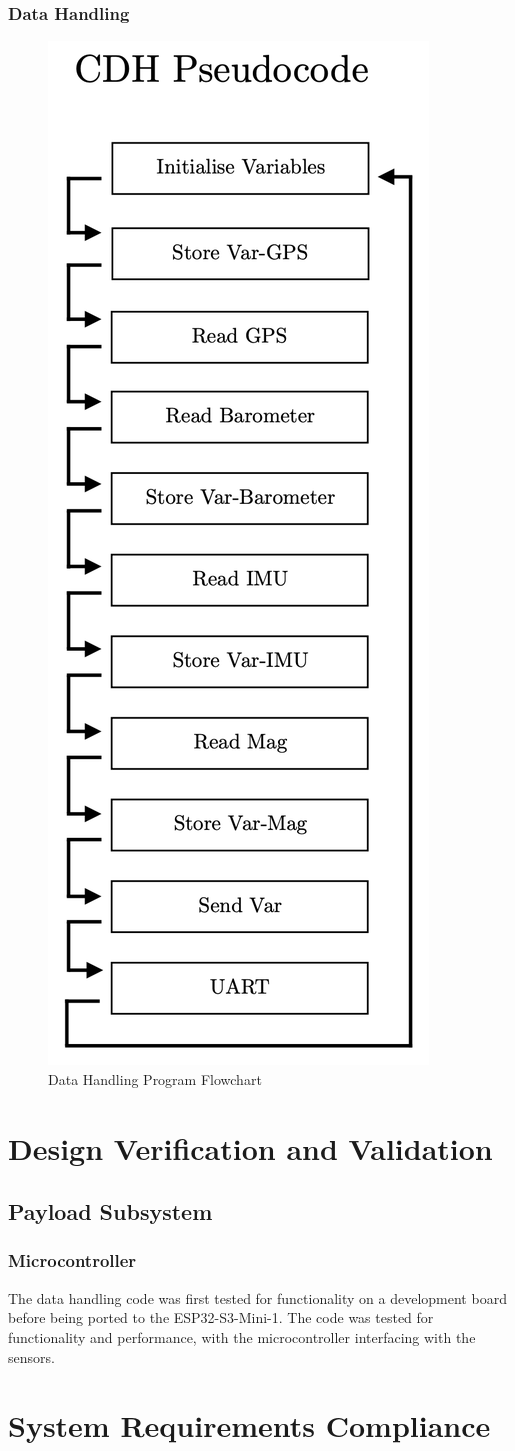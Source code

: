 \documentclass{report}
\begin{document}
            \subsection{Data Handling}
                \begin{figure}[H]
                    \centering
                    \includegraphics[width=0.2\linewidth]{figures/CDH_CODE.png}
                    \caption{Data Handling Program Flowchart}
                    \label{fig:cdh}
                \end{figure}
        
    \chapter{Design Verification and Validation}
        \section{Payload Subsystem}
            \subsection{Microcontroller}
                The data handling code was first tested for functionality
                on a development board before being ported to the 
                ESP32-S3-Mini-1. The code was tested for functionality
                and performance, with the microcontroller interfacing
                with the sensors.
        \chapter{System Requirements Compliance}
    \printbibliography
\end{document}
